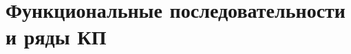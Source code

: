 \documentclass[../main.tex]{subfiles}
\begin{document}
 \chapter{Функциональные последовательности и ряды КП}
 
\end{document}
